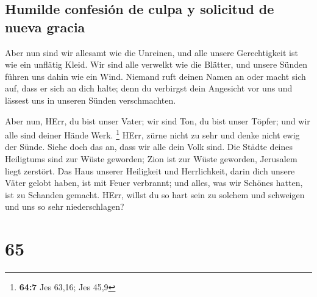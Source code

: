\hypertarget{humilde-confesiuxf3n-de-culpa-y-solicitud-de-nueva-gracia}{%
\subsection{Humilde confesión de culpa y solicitud de nueva
gracia}\label{humilde-confesiuxf3n-de-culpa-y-solicitud-de-nueva-gracia}}

 Aber nun sind wir allesamt wie die Unreinen, und alle
unsere Gerechtigkeit ist wie ein unflätig Kleid. Wir sind alle verwelkt
wie die Blätter, und unsere Sünden führen uns dahin wie ein Wind.
 Niemand ruft deinen Namen an oder macht sich auf, dass er
sich an dich halte; denn du verbirgst dein Angesicht vor uns und lässest
uns in unseren Sünden verschmachten.

 Aber nun, HErr, du bist unser Vater; wir sind Ton, du
bist unser Töpfer; und wir alle sind deiner Hände Werk. \footnote{\textbf{64:7}
  Jes 63,16; Jes 45,9}  HErr, zürne nicht zu sehr und
denke nicht ewig der Sünde. Siehe doch das an, dass wir alle dein Volk
sind.  Die Städte deines Heiligtums sind zur Wüste
geworden; Zion ist zur Wüste geworden, Jerusalem liegt zerstört.
 Das Haus unserer Heiligkeit und Herrlichkeit, darin dich
unsere Väter gelobt haben, ist mit Feuer verbrannt; und alles, was wir
Schönes hatten, ist zu Schanden gemacht.  HErr, willst du
so hart sein zu solchem und schweigen und uns so sehr niederschlagen?

\hypertarget{section-64}{%
\section{65}\label{section-64}}


